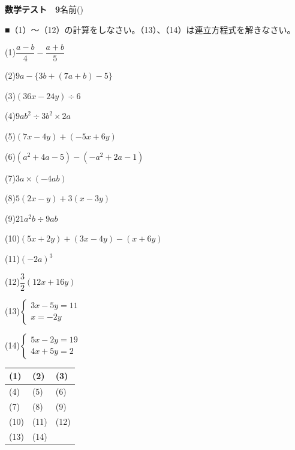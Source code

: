 \documentclass[a4paper,11pt]{ltjsarticle}
\newlength{\qcol}\setlength{\qcol}{0.47\textwidth}
\newlength{\qgap}
\newlength{\anscolw}\setlength{\anscolw}{0.30\textwidth}
\newlength{\ansh}
\newcommand{\Q}[2]{\parbox[t]{\qcol}{\raggedright (#1)\hspace{0.6em}$\displaystyle #2$}}
\newcommand{\QR}[4]{\Q{#1}{#2}\hfill\Q{#3}{#4}\par\vspace{\qgap}}
\newcommand{\anscell}[1]{\rule[-\ansdrop]{0pt}{\ansh}(#1)}
\newlength{\ansdrop}
\begin{document}
{\large\bfseries 数学テスト　9}\hfill 名前(\underline{\hspace{32mm}})\par\vspace{3mm}
■（1）〜（12）の計算をしなさい。（13）、（14）は連立方程式を解きなさい。\par\vspace{3mm}
\setlength{\qgap}{11mm}
\QR{1}{\dfrac{a-b}{4}-\dfrac{a+b}{5}}{2}{9a-\{3b+(7a+b)-5\}}
\QR{3}{(36x-24y)\div6}{4}{9ab^2\div3b^2\times2a}
\QR{5}{(7x-4y)+(-5x+6y)}{6}{(a^2+4a-5)-(-a^2+2a-1)}
\QR{7}{3a\times(-4ab)}{8}{5(2x-y)+3(x-3y)}
\QR{9}{21a^2b\div9ab}{10}{(5x+2y)+(3x-4y)-(x+6y)}
\QR{11}{(-2a)^3}{12}{\dfrac{3}{2}(12x+16y)}
\QR{13}{\left\{\begin{array}{l} 3x-5y=11 \\ x=-2y \end{array}\right.}{14}{\left\{\begin{array}{l} 5x-2y=19 \\ 4x+5y=2 \end{array}\right.}
\vfill
\setlength{\ansh}{12mm}\setlength{\ansdrop}{8mm}%
\begin{center}\begin{tabular}{|p{\anscolw}|p{\anscolw}|p{\anscolw}|}\hline
\anscell{1} & \anscell{2} & \anscell{3} \\\hline
\anscell{4} & \anscell{5} & \anscell{6} \\\hline
\anscell{7} & \anscell{8} & \anscell{9} \\\hline
\anscell{10} & \anscell{11} & \anscell{12} \\\hline
\anscell{13} & \anscell{14} &  \\\hline
\end{tabular}\end{center}
\end{document}
